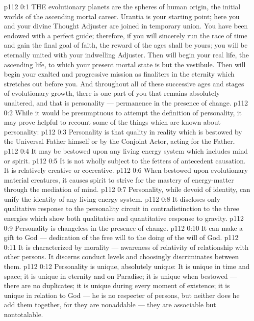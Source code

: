 \vs p112 0:1 THE evolutionary planets are the spheres of human origin, the initial worlds of the ascending mortal career. Urantia is your starting point; here you and your divine Thought Adjuster are joined in temporary union. You have been endowed with a perfect guide; therefore, if you will sincerely run the race of time and gain the final goal of faith, the reward of the ages shall be yours; you will be eternally united with your indwelling Adjuster. Then will begin your real life, the ascending life, to which your present mortal state is but the vestibule. Then will begin your exalted and progressive mission as finaliters in the eternity which stretches out before you. And throughout all of these successive ages and stages of evolutionary growth, there is one part of you that remains absolutely unaltered, and that is personality --- permanence in the presence of change.
\vs p112 0:2 \pc While it would be presumptuous to attempt the definition of personality, it may prove helpful to recount some of the things which are known about personality:
\vs p112 0:3 \bibnobreakspace Personality is that quality in reality which is bestowed by the Universal Father himself or by the Conjoint Actor, acting for the Father.
\vs p112 0:4 \pc {}\bibnobreakspace It may be bestowed upon any living energy system which includes mind or spirit.
\vs p112 0:5 \pc {}\bibnobreakspace It is not wholly subject to the fetters of antecedent causation. It is relatively creative or cocreative.
\vs p112 0:6 \pc {}\bibnobreakspace When bestowed upon evolutionary material creatures, it causes spirit to strive for the mastery of energy\hyp{}matter through the mediation of mind.
\vs p112 0:7 \pc {}\bibnobreakspace Personality, while devoid of identity, can unify the identity of any living energy system.
\vs p112 0:8 \pc {}\bibnobreakspace It discloses only qualitative response to the personality circuit in contradistinction to the three energies which show both qualitative and quantitative response to gravity.
\vs p112 0:9 \pc {}\bibnobreakspace Personality is changeless in the presence of change.
\vs p112 0:10 \pc {}\bibnobreakspace It can make a gift to God --- dedication of the free will to the doing of the will of God.
\vs p112 0:11 \pc {}\bibnobreakspace It is characterized by morality --- awareness of relativity of relationship with other persons. It discerns conduct levels and choosingly discriminates between them.
\vs p112 0:12 \pc {}\bibnobreakspace Personality is unique, absolutely unique: It is unique in time and space; it is unique in eternity and on Paradise; it is unique when bestowed --- there are no duplicates; it is unique during every moment of existence; it is unique in relation to God --- he is no respecter of persons, but neither does he add them together, for they are nonaddable --- they are associable but nontotalable.
